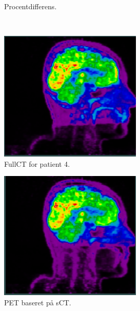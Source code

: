 \begin{figure}[H]
\begin{subfigure}{0.3\textwidth}
        \caption{Procentdifferens.}
        \label{col:loocv_pet_pat3_pd}
    \end{subfigure}\\
    \begin{subfigure}{0.3\textwidth}
        \centering
        \includegraphics[width=0.75\textwidth]{colager/loocv_pet/loocv_010960_pet_ct.png}
        \caption{FullCT for patient 4.}
        \label{col:loocv_pet_pat4_ct}
    \end{subfigure}\hfill
    \begin{subfigure}{0.3\textwidth}
        \centering
        \includegraphics[width=0.75\textwidth]{colager/loocv_pet/loocv_010960_pet_sct.png}
        \caption{PET baseret på sCT.}
        \label{col:loocv_pet_pat4_sct}
    \end{subfigure}\hfill
    \begin{subfigure}{0.3\textwidth}

\end{subfigure}
\end{figure}
